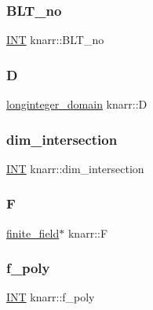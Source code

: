 \subsubsection{\texorpdfstring{B\+L\+T\+\_\+no}{BLT\_no}}
{\footnotesize\ttfamily \mbox{\hyperlink{galois_8h_a09fddde158a3a20bd2dcadb609de11dc}{I\+NT}} knarr\+::\+B\+L\+T\+\_\+no}

\mbox{\label{classknarr_a18b88990fe2bbfc25c8a9da4bf4dec1a}} 
\subsubsection{\texorpdfstring{D}{D}}
{\footnotesize\ttfamily \mbox{\hyperlink{classlonginteger__domain}{longinteger\+\_\+domain}} knarr\+::D}

\mbox{\label{classknarr_a08f22338b0990cce0a424e63c37ecbf3}} 
\subsubsection{\texorpdfstring{dim\+\_\+intersection}{dim\_intersection}}
{\footnotesize\ttfamily \mbox{\hyperlink{galois_8h_a09fddde158a3a20bd2dcadb609de11dc}{I\+NT}} knarr\+::dim\+\_\+intersection}

\mbox{\label{classknarr_aa0e365d405ed5af05b49ffa9c1b7a842}} 
\subsubsection{\texorpdfstring{F}{F}}
{\footnotesize\ttfamily \mbox{\hyperlink{classfinite__field}{finite\+\_\+field}}$\ast$ knarr\+::F}

\mbox{\label{classknarr_a1a384d24f79c6a50449665063be62b70}} 
\subsubsection{\texorpdfstring{f\+\_\+poly}{f\_poly}}
{\footnotesize\ttfamily \mbox{\hyperlink{galois_8h_a09fddde158a3a20bd2dcadb609de11dc}{I\+NT}} knarr\+::f\+\_\+poly}

